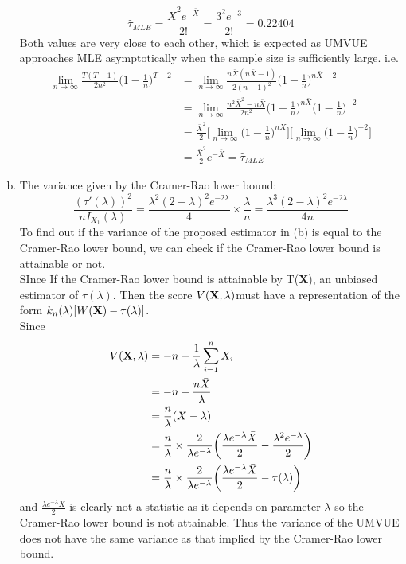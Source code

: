 \documentclass[a4paper,11pt]{article}
\begin{document}
\begin{enumerate}[(a)]
		\[
		\hat{\tau}_{MLE} =\frac{\bar{X}^2e^{-\bar{X}}}{2!} =\frac{3^2e^{-3}}{2!}=0.22404
		\]
		Both values are very close to each other, which is expected as UMVUE approaches MLE asymptotically when the sample size is sufficiently large. i.e.
		\begin{align*}
		\lim_{n\rightarrow \infty} \frac{T(T-1)}{2n^2} \bigg(1-\frac{1}{n}\bigg)^{T-2} &= \lim_{n\rightarrow \infty} \frac{n\bar{X}(n\bar{X}-1)}{2(n-1)^2} \bigg(1-\frac{1}{n}\bigg)^{n\bar{X}-2 } \\
		&=  \lim_{n\rightarrow \infty} \frac{n^2\bar{X}^2-n\bar{X}}{2n^2}\bigg( 1-\frac{1}{n} \bigg)^{n\bar{X}} \bigg( 1-\frac{1}{n} \bigg)^{-2}\\
		&= \frac{\bar{X}^2}{2}\bigg[\lim_{n\rightarrow \infty }\bigg( 1-\frac{1}{n} \bigg)^{n\bar{X}}  \bigg]\bigg[ \lim_{n\rightarrow \infty} \bigg( 1-\frac{1}{n} \bigg)^{-2} \bigg]\\
		&= \frac{\bar{X}^2}{2} e^{-\bar{X}} =  \hat{\tau}_{MLE}
		\end{align*}
	\item
		The variance given by the Cramer-Rao lower bound:
		\[
		\frac{(\tau' (\lambda))^2}{nI_{X_1}(\lambda)}= \frac{\lambda^2(2-\lambda)^2e^{-2\lambda}}{4}\times \frac{\lambda}{n} =  \frac{\lambda^3(2-\lambda)^2e^{-2\lambda}}{4n}
		\]
		To find out if the variance of the proposed estimator in (b) is equal to the Cramer-Rao lower bound, we can check if the Cramer-Rao lower bound is attainable or not.
		\\SInce If the Cramer-Rao lower bound is attainable by T({\bf X}), an unbiased estimator of $\tau(\lambda)$. Then the score $ V({\bf X},\lambda) $must have a representation of the form $k_n(\lambda)[W({\bf X}) -\tau(\lambda)] $.
		\\Since
		\begin{align*}
		V({\bf X},\lambda) &= -n+\frac{1}{\lambda}\sum^n_{i=1}X_i\\
		&= -n +\frac{n\bar{X}}{\lambda} \\
		&=\frac{n}{\lambda}(\bar{X}-\lambda)\\
		&= \frac{n}{\lambda}\times \frac{2}{\lambda e^{-\lambda}}\bigg(\frac{\lambda e^{-\lambda}\bar{X}}{2}-\frac{\lambda^2 e^{-\lambda}}{2}\bigg)\\
		&= \frac{n}{\lambda}\times \frac{2}{\lambda e^{-\lambda}}\bigg(\frac{\lambda e^{-\lambda}\bar{X}}{2}-\tau(\lambda)\bigg)\\
		\end{align*}
		and $\frac{\lambda e^{-\lambda}\bar{X}}{2}$ is clearly not a statistic as it depends on parameter $\lambda$ so the Cramer-Rao lower bound is not attainable. Thus the variance of the UMVUE does not have the same variance as that implied by the Cramer-Rao lower bound.

\end{enumerate}
\end{document}
